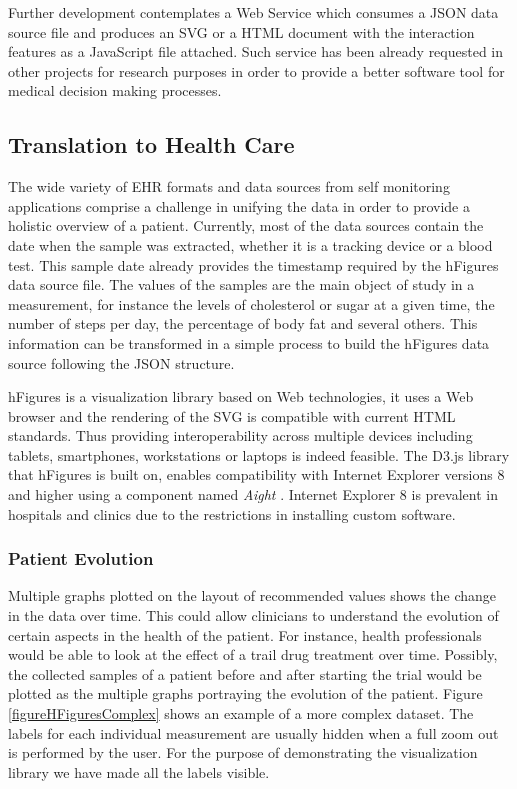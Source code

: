 \documentclass[twocolumn]{bmcart}%
\begin{document}
Further development contemplates a Web Service which consumes a JSON data source file and produces an SVG or a HTML document with the interaction features as a JavaScript file attached. Such service has been already requested in other projects for research purposes in order to provide a better software tool for medical decision making processes.

\subsection*{Translation to Health Care}

The wide variety of EHR formats and data sources from self monitoring applications comprise a challenge in unifying the data in order to provide a holistic overview of a patient. Currently, most of the data sources contain the date when the sample was extracted, whether it is a tracking device or a blood test. This sample date already provides the timestamp required by the hFigures data source file. The values of the samples are the main object of study in a measurement, for instance the levels of cholesterol or sugar at a given time, the number of steps per day, the percentage of body fat and several others. This information can be transformed in a simple process to build the hFigures data source following the JSON structure.

hFigures is a visualization library based on Web technologies, it uses a Web browser and the rendering of the SVG is compatible with current HTML standards. Thus providing interoperability across multiple devices including tablets, smartphones, workstations or laptops is indeed feasible. The D3.js library that hFigures is built on, enables compatibility with Internet Explorer versions 8 and higher using a component named \textit{Aight} \cite{aight}. Internet Explorer 8 is prevalent in hospitals and clinics due to the restrictions in installing custom software.

\subsubsection*{Patient Evolution}

Multiple graphs plotted on the layout of recommended values shows the change in the data over time. This could allow clinicians to understand the evolution of certain aspects in the health of the patient. For instance, health professionals would be able to look at the effect of a trail drug treatment over time. Possibly, the collected samples of a patient before and after starting the trial would be plotted as the multiple graphs portraying the evolution of the patient. Figure \ref{figureHFiguresComplex} shows an example of a more complex dataset. The labels for each individual measurement are usually hidden when a full zoom out is performed by the user. For the purpose of demonstrating the visualization library we have made all the labels visible. 
\end{document}
